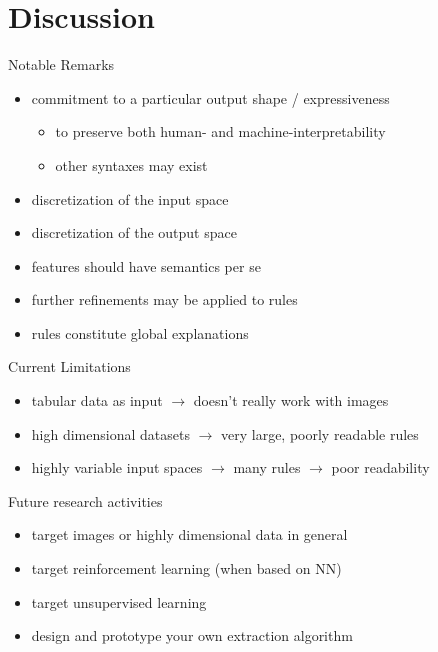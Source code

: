 \documentclass[presentation]{beamer}\mode<presentation>{\usetheme{AMSBolognaFC}}
\begin{document}
\section{Discussion}

\begin{frame}{Notable Remarks}
    \begin{itemize}
        \item commitment to a particular output shape / expressiveness
        \begin{itemize}
            \item to preserve both human- and machine-interpretability
            \item other syntaxes may exist
        \end{itemize}
        \item discretization of the input space
        \item discretization of the output space
        \item features should have semantics per se
        \item further refinements may be applied to rules
        \item rules constitute global explanations
    \end{itemize}
\end{frame}

\begin{frame}{Current Limitations}
    \begin{itemize}
        \item tabular data as input $\rightarrow$ doesn't really work with images
        \item high dimensional datasets $\rightarrow$ very large, poorly readable rules
        \item highly variable input spaces $\rightarrow$ many rules $\rightarrow$ poor readability
    \end{itemize}
\end{frame}

\begin{frame}{Future research activities}
    \begin{itemize}
        \item target images or highly dimensional data in general
        \item target reinforcement learning (when based on NN)
        \item target unsupervised learning
        \item design and prototype your own extraction algorithm
    \end{itemize}
\end{frame}
\end{document}
